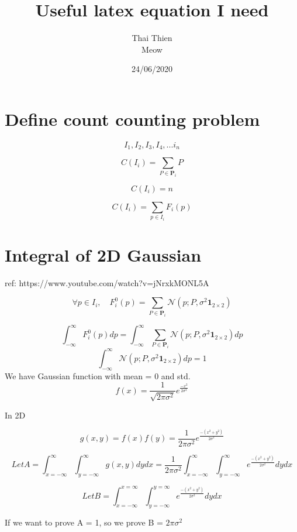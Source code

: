 \documentclass[a4paper]{article}
\title{Useful latex equation I need}
\author{Thai Thien\\
        Meow\\
}
\date{24/06/2020}
\theoremstyle{definition}
\theoremstyle{plain}
\begin{document}
\maketitle


\section{Define count counting problem}

\[ I_1, I_2, I_3, I_4, ... i_n \]

\[ C(I_i) = \sum_{P \in \mathbf{P}_{i}} P \]

\[ C(I_i) = n \]


\[ C(I_i) = \sum_{p \in I_{i}} F_{i}(p) \]





\section{Integral of 2D Gaussian}

ref: https://www.youtube.com/watch?v=jNrxkMONL5A

\[ \forall p \in I_{i}, \quad F_{i}^{0}(p)=\sum_{P \in \mathbf{P}_{i}} \mathcal{N}\left(p ; P, \sigma^{2} \mathbf{1}_{2 \times 2}\right) \]


\[ \int_{-\infty}^{\infty}   F_{i}^{0}(p) dp = \int_{-\infty}^{\infty} \sum_{P \in \mathbf{P}_{i}} \mathcal{N}\left(p ; P, \sigma^{2} \mathbf{1}_{2 \times 2}\right) dp \]
\[ \int_{-\infty}^{\infty}\mathcal{N}\left(p ; P, \sigma^{2} \mathbf{1}_{2 \times 2}\right) dp = 1 \]
We have Gaussian function with mean = 0 and std.
\[ f(x) = \frac{1}{\sqrt{2\pi\sigma^2}} e^\frac{-x^2}{2\sigma^2} \]


In 2D

\[ g(x, y) = f(x)f(y) = \frac{1}{2\pi\sigma^2} e^\frac{-(x^2+y^2)}{2\sigma^2} \]



\[ Let A = \int_{x=-\infty}^{\infty}\int_{y=-\infty}^{\infty} g(x,y)dydx = \frac{1}{2\pi\sigma^2} \int_{x=-\infty}^{\infty}\int_{y=-\infty}^{\infty} e^\frac{-(x^2+y^2)}{2\sigma^2} dydx\]

\[ Let B =  \int_{x=-\infty}^{x=\infty}\int_{y=-\infty}^{y=\infty} e^\frac{-(x^2+y^2)}{2\sigma^2} dydx\]

If we want to prove A = 1, so we prove B = $2\pi\sigma^2$
\end{document}
